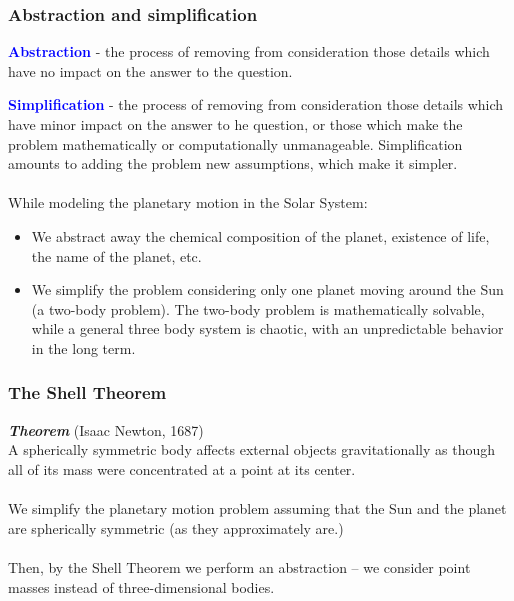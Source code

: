 \documentclass[aspectratio=169,xcolor=pdftex,dvipsnames]{beamer} %
\renewcommand{\emph}[1]{\textcolor{Emph}{\bf\textit{#1}}}
\newcommand{\jemph}[1]{\textcolor{Blue}{\textbf{#1}}}
\begin{document}

%
%
%  
%
%


\begin{frame}
\frametitle{Abstraction and simplification}

\jemph{Abstraction} - the process of removing from consideration those details which have no impact on the answer to the question.

\jemph{Simplification} - the process of removing from consideration those details which have minor impact on the answer to he question, or those which make the problem mathematically or computationally unmanageable.
Simplification amounts to adding the problem new assumptions, which make it simpler.
\\ \ \\
While modeling the planetary motion in the Solar System:
\begin{itemize}
\item
We abstract away the chemical composition of the planet, existence of life, the name of the planet, etc.
\item
We simplify the problem considering only one planet moving around the Sun (a two-body problem).
The two-body problem is mathematically solvable, while a general three body system is chaotic, with an unpredictable behavior in the long term.
\end{itemize}


\end{frame}

\begin{frame}
\frametitle{The Shell Theorem}

\emph{Theorem} (Isaac Newton, 1687)\\
A spherically symmetric body affects external objects gravitationally as though all of its mass were concentrated at a point at its center.
\\ \ \\
We simplify the planetary motion problem assuming that the Sun and the planet are spherically symmetric (as they approximately are.)
\\ \ \\
Then, by the Shell Theorem we perform an abstraction -- we consider point masses instead of three-dimensional bodies.

\end{frame}
\end{document}
